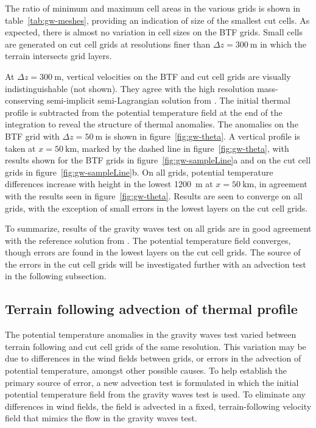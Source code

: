 \documentclass{ametsoc}
\begin{document}
The ratio of minimum and maximum cell areas in the various grids is shown in table~\ref{tab:gw-meshes}, providing an indication of size of the smallest cut cells.  As expected, there is almost no variation in cell sizes on the BTF grids.  Small cells are generated on cut cell grids at resolutions finer than $\Delta z = \SI{300}{\meter}$ in which the terrain intersects grid layers.

At $\Delta z = \SI{300}{\meter}$, vertical velocities on the BTF and cut cell grids are visually indistinguishable (not shown).  They agree with the high resolution mass-conserving semi-implicit semi-Lagrangian solution from \citet{melvin2010}.
The initial thermal profile is subtracted from the potential temperature field at the end of the integration to reveal the structure of thermal anomalies.  The anomalies on the BTF grid with $\Delta z = \SI{50}{\meter}$ is shown in figure~\ref{fig:gw-theta}.  A vertical profile is taken at $x = \SI{50}{\kilo\meter}$, marked by the dashed line in figure~\ref{fig:gw-theta}, with results shown for the BTF grids in figure~\ref{fig:gw-sampleLine}a and on the cut cell grids in figure~\ref{fig:gw-sampleLine}b.  On all grids, potential temperature differences increase with height in the lowest \SI{1200}{\meter} at $x = \SI{50}{\kilo\meter}$, in agreement with the results seen in figure~\ref{fig:gw-theta}.  Results are seen to converge on all grids, with the exception of small errors in the lowest layers on the cut cell grids.

To summarize, results of the gravity waves test on all grids are in good agreement with the reference solution from \citet{melvin2010}.  The potential temperature field converges, though errors are found in the lowest layers on the cut cell grids.  The source of the errors in the cut cell grids will be investigated further with an advection test in the following subsection.

\subsection{Terrain following advection of thermal profile}
The potential temperature anomalies in the gravity waves test varied between terrain following and cut cell grids of the same resolution.  This variation may be due to differences in the wind fields between grids, or errors in the advection of potential temperature, amongst other possible causes.  To help establish the primary source of error, a new advection test is formulated in which the initial potential temperature field from the gravity waves test is used.  To eliminate any differences in wind fields, the field is advected in a fixed, terrain-following velocity field that mimics the flow in the gravity waves test.
\end{document}
